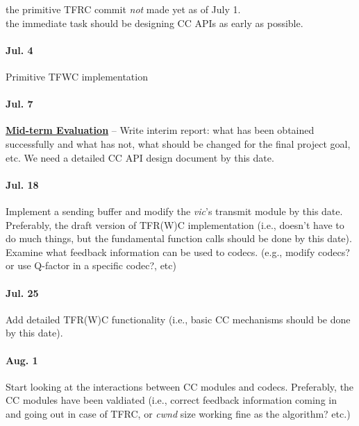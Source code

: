 \vspace{.5cm}

\begin{center}
\textsf{the primitive TFRC commit \emph{not} made yet as of July 1. 
\\ the immediate task should be designing CC APIs as early as possible.}
\end{center}

\vspace{.5cm}

\paragraph{\textsf{Jul. 4}} Primitive TFWC implementation

\paragraph{\textsf{Jul. 7}} \underline{\textbf{Mid-term Evaluation}} -- Write
interim report: what has been obtained successfully and what has not, what
should be changed for the final project goal, etc. We need a detailed CC API
design document by this date.

\paragraph{\textsf{Jul. 18}} Implement a sending buffer and modify the
\emph{vic}'s transmit module by this date. Preferably, the draft version of
TFR(W)C implementation (i.e., doesn't have to do much things, but the
fundamental function calls should be done by this date).  Examine what feedback
information can be used to codecs.  (e.g., modify codecs?  or use Q-factor in a
specific codec?, etc)

\paragraph{\textsf{Jul. 25}} Add detailed TFR(W)C functionality (i.e., basic CC
mechanisms should be done by this date).

\paragraph{\textsf{Aug. 1}} Start looking at the interactions between CC modules
and codecs. Preferably, the CC modules have been valdiated (i.e., correct
feedback information coming in and going out in case of TFRC, or \emph{cwnd}
size working fine as the algorithm? etc.)

